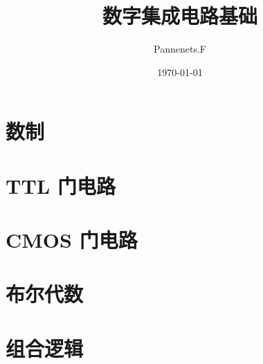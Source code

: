 \documentclass[cn,11pt,chinese,black,simple,device=ppt]{elegantbook}
\title{数字集成电路基础}
\author{Pannenets.F}
\date{\today}
\begin{document}
\maketitle
\frontmatter


\mainmatter

\chapter{数制}



\chapter{TTL 门电路}



\chapter{CMOS 门电路}



\chapter{布尔代数}



\chapter{组合逻辑}


\end{document}
